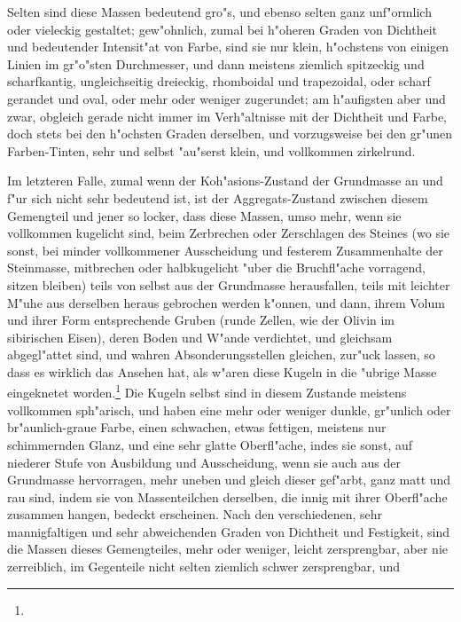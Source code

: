 \documentclass[a4paper, 11pt, oneside, german]{article}
\begin{document}
Selten sind diese Massen bedeutend gro"s, und ebenso selten ganz unf"ormlich oder vieleckig gestaltet; gew"ohnlich, zumal bei h"oheren Graden von Dichtheit und bedeutender Intensit"at von Farbe, sind sie nur klein, h"ochstens von einigen Linien im gr"o"sten Durchmesser, und dann meistens ziemlich spitzeckig und scharfkantig, ungleichseitig dreieckig, rhomboidal und trapezoidal, oder scharf gerandet und oval, oder mehr oder weniger zugerundet; am h"aufigsten aber und zwar, obgleich gerade nicht immer im Verh"altnisse mit der Dichtheit und Farbe, doch stets bei den h"ochsten Graden derselben, und vorzugsweise bei den gr"unen Farben-Tinten, sehr und selbst "au"serst klein, und vollkommen zirkelrund.

Im letzteren Falle, zumal wenn der Koh"asions-Zustand der Grundmasse an und f"ur sich nicht sehr bedeutend ist, ist der Aggregats-Zustand zwischen diesem Gemengteil und jener so locker, dass diese Massen, umso mehr, wenn sie vollkommen kugelicht sind, beim Zerbrechen oder Zerschlagen des Steines (wo sie sonst, bei minder vollkommener Ausscheidung und festerem Zusammenhalte der Steinmasse, mitbrechen oder halbkugelicht "uber die Bruchfl"ache vorragend, sitzen bleiben) teils von selbst aus der Grundmasse herausfallen, teils mit leichter M"uhe aus derselben heraus gebrochen werden k"onnen, und dann, ihrem Volum und ihrer Form entsprechende Gruben (runde Zellen, wie der Olivin im sibirischen Eisen), deren Boden und W"ande verdichtet, und gleichsam abgegl"attet sind, und wahren Absonderungsstellen gleichen, zur"uck lassen, so dass es wirklich das Ansehen hat, als w"aren diese Kugeln in die "ubrige Masse eingeknetet worden.\footnote{} Die Kugeln selbst sind in diesem Zustande meistens vollkommen sph"arisch, und haben eine mehr oder weniger dunkle, gr"unlich oder br"aunlich-graue Farbe, einen schwachen, etwas fettigen, meistens nur schimmernden Glanz, und eine sehr glatte Oberfl"ache, indes sie sonst, auf niederer Stufe von Ausbildung und Ausscheidung, wenn sie auch aus der Grundmasse hervorragen, mehr uneben und gleich dieser gef"arbt, ganz matt und rau sind, indem sie von Massenteilchen derselben, die innig mit ihrer Oberfl"ache zusammen hangen, bedeckt erscheinen. Nach den verschiedenen, sehr mannigfaltigen und sehr abweichenden Graden von Dichtheit und Festigkeit, sind die Massen dieses Gemengteiles, mehr oder weniger, leicht zersprengbar, aber nie zerreiblich, im Gegenteile nicht selten ziemlich schwer zersprengbar, und 
\end{document}
